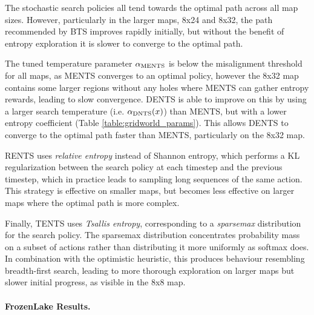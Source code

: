     The stochastic search policies all tend towards the optimal path across all map sizes. However, particularly in the larger maps, 8x24 and 8x32, the path recommended by BTS improves rapidly initially, but without the benefit of entropy exploration it is slower to converge to the optimal path.

    The tuned temperature parameter ${\alpha_{{\textnormal{MENTS}}}}$ is below the misalignment threshold for all maps, as MENTS converges to an optimal policy, however the 8x32 map contains some larger regions without any holes where MENTS can gather entropy rewards, leading to slow convergence. DENTS is able to improve on this by using a larger search temperature (i.e. ${\alpha_{{\textnormal{DNTS}}}}(x)$) than MENTS, but with a lower entropy coefficient (Table \mbox{\ref{table:gridworld_params}}). This allows DENTS to converge to the optimal path faster than MENTS, particularly on the 8x32 map.

    RENTS uses \textit{relative entropy} instead of Shannon entropy, which performs a KL regularization between the search policy at each timestep and the previous timestep, which in practice leads to sampling long sequences of the same action. This strategy is effective on smaller maps, but becomes less effective on larger maps where the optimal path is more complex.

    Finally, TENTS uses \textit{Tsallis entropy}, corresponding to a \textit{sparsemax} distribution for the search policy. The sparsemax distribution concentrates 
    probability mass on a subset of actions rather than 
    distributing it more uniformly as softmax does. In combination 
    with the optimistic heuristic, this produces behaviour 
    resembling breadth-first search, leading to more thorough 
    exploration on larger maps but slower initial progress, as visible in the 8x8 map.






    \paragraph{FrozenLake Results.}

